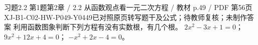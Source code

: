 \par\noindent\begin{minipage}{\linewidth}
\begin{bankitem}{习题2.2 第1题}{第2章 / 2.2 从函数观点看一元二次方程 / 教材 p.49 / PDF 第56页}{XJ-B1-C02-HW-P049-Y0449}{已对照原页转写题干及公式；待教师复核；未制作答案}
利用函数图象判断下列方程有没有实数根，有几个根。
$2x^2-3x+1=0$；
$9x^2+12x+4=0$；
$-x^2+2x-4=0$。
\end{bankitem}
\end{minipage}\par\medskip
